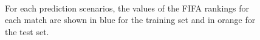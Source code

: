 \documentclass{statsoc}
\begin{document}
\begin{center}
\begin{figure}
~
\\
\centering
{}
\caption{For each prediction scenarios, the values of the FIFA rankings for each match are shown in blue  for the training set and in orange  for the test set.}
\label{Fig1}
\end{figure}
\end{center}
\end{document}
